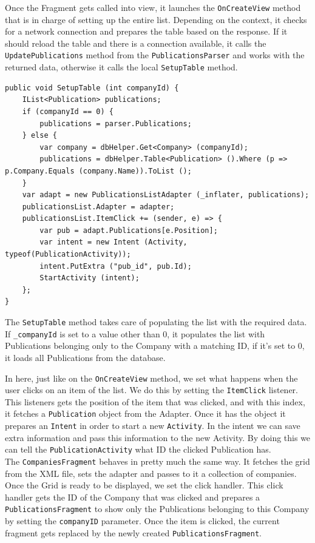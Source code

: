 Once the Fragment gets called into view, it launches the \texttt{OnCreateView} method that is in charge of setting up the entire list. Depending on the context, it checks for a network connection and prepares the table based on the response. If it should reload the table and there is a connection available, it calls the \texttt{UpdatePublications} method from the \texttt{PublicationsParser} and works with the returned data, otherwise it calls the local \texttt{SetupTable} method.

\begin{lstlisting}[frame=lt,caption=SetupTable, label={list:pub_setup}]
public void SetupTable (int companyId) {
	IList<Publication> publications;
	if (companyId == 0) {
		publications = parser.Publications;
	} else {
		var company = dbHelper.Get<Company> (companyId);
		publications = dbHelper.Table<Publication> ().Where (p => p.Company.Equals (company.Name)).ToList ();
	}
	var adapt = new PublicationsListAdapter (_inflater, publications); 
	publicationsList.Adapter = adapter;
	publicationsList.ItemClick += (sender, e) => {
		var pub = adapt.Publications[e.Position];
		var intent = new Intent (Activity, typeof(PublicationActivity));
		intent.PutExtra ("pub_id", pub.Id);
		StartActivity (intent);
	};
}
\end{lstlisting}


The \texttt{SetupTable} method takes care of populating the list with the required data. If \texttt{\_companyId} is set to a value other than 0, it populates the list with Publications belonging only to the Company with a matching ID, if it's set to 0, it loads all Publications from the database.

In here, just like on the \texttt{OnCreateView} method, we set what happens when the user clicks on an item of the list. We do this by setting the \texttt{ItemClick} listener. This listeners gets the position of the item that was clicked, and with this index, it fetches a \texttt{Publication} object from the Adapter. Once it has the object it prepares an \texttt{Intent} in order to start a new \texttt{Activity}. In the intent we can save extra information and pass this information to the new Activity. By doing this we can tell the \texttt{PublicationActivity} what ID the clicked Publication has.\\
\newline
The \texttt{CompaniesFragment} behaves in pretty much the same way. It fetches the grid from the \ac{XML} file, sets the adapter and passes to it a collection of companies. Once the Grid is ready to be displayed, we set the click handler. This click handler gets the ID of the Company that was clicked and prepares a \texttt{PublicationsFragment} to show only the Publications belonging to this Company by setting the \texttt{companyID} parameter. Once the item is clicked, the current fragment gets replaced by the newly created \texttt{PublicationsFragment}.\\


